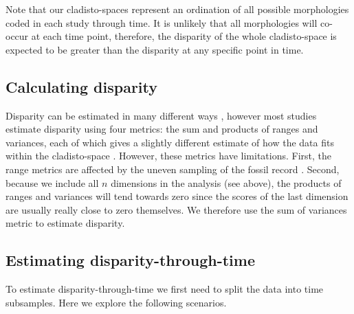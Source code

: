 \documentclass[12pt,a4paper]{article}
\begin{document}
Note that our cladisto-spaces represent an ordination of all possible morphologies coded in each study through time.
It is unlikely that all morphologies will co-occur at each time point, therefore, the disparity of the whole cladisto-space is expected to be greater than the disparity at any specific point in time.

\subsection{Calculating disparity}
\label{disparity_calc}
Disparity can be estimated in many different ways \citep[e.g.][]{Wills1994,Ciampaglio2004,thorneresetting2011,hopkinsdecoupling2013,huang2015origins}, however most studies estimate disparity using four metrics: the sum and products of ranges and variances, each of which gives a slightly different estimate of how the data fits within the cladisto-space \citep{Foote01071994,Wills1994,brusatte50,Brusatte12092008,cisneros2010,thorneresetting2011,prentice2011,brusattedinosaur2012,toljagictriassic-jurassic2013,ruta2013,bentonmodels2014,bensonfaunal2014}.
However, these metrics have limitations. 
First, the range metrics are affected by the uneven sampling of the fossil record \citep{Butler2012}.
Second, because we include all $n$ dimensions in the analysis (see above), the products of ranges and variances will tend towards zero since the scores of the last dimension are usually really close to zero themselves. 
We therefore use the sum of variances metric to estimate disparity.

\subsection{Estimating disparity-through-time} 
\label{time_slicing}

To estimate disparity-through-time we first need to split the data into time subsamples.
Here we explore the following scenarios.
\end{document}
